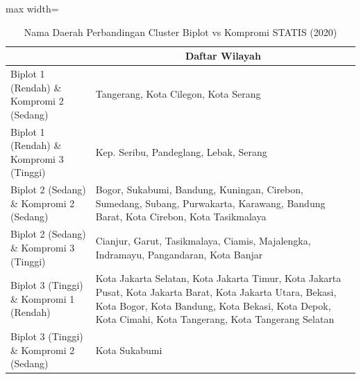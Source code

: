 \begin{table}[H]
\centering
\caption{Nama Daerah Perbandingan Cluster Biplot vs Kompromi STATIS (2020)} \label{tab:app2biplot_comp_name_2020}
\begin{adjustbox}{max width=\textwidth}
\begin{tabular}{|>{\centering\arraybackslash}p{4cm}|p{10cm}|}
\hline
\multicolumn{1}{|c|}{\textbf{Kategori}} & \multicolumn{1}{c|}{\textbf{Daftar Wilayah}} \\
\hline
Biplot 1 (Rendah) \& Kompromi 2 (Sedang) & Tangerang, Kota Cilegon, Kota Serang \\
\hline
Biplot 1 (Rendah) \& Kompromi 3 (Tinggi) & Kep. Seribu, Pandeglang, Lebak, Serang \\
\hline
Biplot 2 (Sedang) \& Kompromi 2 (Sedang) & Bogor, Sukabumi, Bandung, Kuningan, Cirebon, Sumedang, Subang, Purwakarta, Karawang, Bandung Barat, Kota Cirebon, Kota Tasikmalaya \\
\hline
Biplot 2 (Sedang) \& Kompromi 3 (Tinggi) & Cianjur, Garut, Tasikmalaya, Ciamis, Majalengka, Indramayu, Pangandaran, Kota Banjar \\
\hline
Biplot 3 (Tinggi) \& Kompromi 1 (Rendah) & Kota Jakarta Selatan, Kota Jakarta Timur, Kota Jakarta Pusat, Kota Jakarta Barat, Kota Jakarta Utara, Bekasi, Kota Bogor, Kota Bandung, Kota Bekasi, Kota Depok, Kota Cimahi, Kota Tangerang, Kota Tangerang Selatan \\
\hline
Biplot 3 (Tinggi) \& Kompromi 2 (Sedang) & Kota Sukabumi \\
\hline
\end{tabular}
\end{adjustbox}
\end{table}
